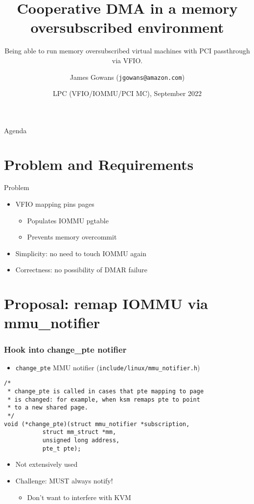\documentclass{beamer}
\title{Cooperative DMA in a memory oversubscribed environment}
\subtitle{Being able to run memory oversubscribed virtual machines with PCI passthrough via VFIO.}
\author[James Gowans (EC2) ]{James Gowans (\texttt{jgowans@amazon.com})}
\institute{Amazon / AWS / EC2}
\date{LPC (VFIO/IOMMU/PCI MC), September 2022}
\begin{document}
\begin{frame}
\titlepage
\end{frame}


\begin{frame}{Agenda}
  \tableofcontents[hideallsubsections]
\end{frame}


\section{Problem and Requirements}
\begin{frame}{Problem}
  \begin{itemize}
    \item VFIO mapping pins pages
    \begin{itemize}
      \item Populates IOMMU pgtable
      \item Prevents memory overcommit
    \end{itemize}
    \item Simplicity: no need to touch IOMMU again
    \item Correctness: no possibility of DMAR failure
  \end{itemize}
\end{frame}

\section{Proposal: remap IOMMU via mmu\_notifier}
\begin{frame}[fragile]
  \frametitle{Hook into change\_pte notifier}
  \begin{itemize}
    \item \texttt{change\_pte} MMU notifier (\texttt{include/linux/mmu\_notifier.h})
  \end{itemize}
  \begin{verbatim}
/*
 * change_pte is called in cases that pte mapping to page
 * is changed: for example, when ksm remaps pte to point
 * to a new shared page.
 */
void (*change_pte)(struct mmu_notifier *subscription,
		   struct mm_struct *mm,
		   unsigned long address,
		   pte_t pte);
  \end{verbatim}
  \begin{itemize}
    \item Not extensively used
    \item Challenge: MUST always notify!
    \begin{itemize}
      \item Don't want to interfere with KVM
    \end{itemize}
  \end{itemize}
\end{frame}
\end{document}
